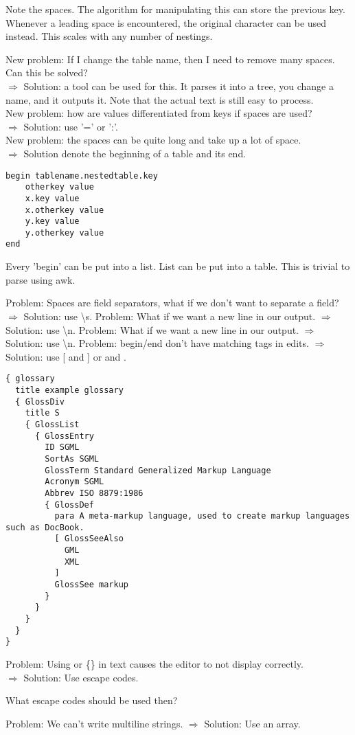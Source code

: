 \documentclass[listof=totoc]{article}
\begin{document}
Note the spaces. The algorithm for manipulating this can store the previous key. Whenever a leading space is
encountered, the original character can be used instead. This scales with any number of nestings.

New problem: If I change the table name, then I need to remove many spaces. Can this be solved?\\
$\Rightarrow$ Solution: a tool can be used for this. It parses it into a tree, you change a name, and it outputs it. Note that the actual text is still easy to process.\\
New problem: how are values differentiated from keys if spaces are used?\\
$\Rightarrow$ Solution: use '=' or ':'.\\
New problem: the spaces can be quite long and take up a lot of space.\\
$\Rightarrow$ Solution denote the beginning of a table and its end.\\

\begin{verbatim}
begin tablename.nestedtable.key
	otherkey value
	x.key value
	x.otherkey value
	y.key value
	y.otherkey value
end
\end{verbatim}

Every 'begin' can be put into a list. List can be put into a table.
This is trivial to parse using awk.

Problem: Spaces are field separators, what if we don't want to separate a field?\\
$\Rightarrow$ Solution: use \textbackslash s.
Problem: What if we want a new line in our output.
$\Rightarrow$ Solution: use \textbackslash n.
Problem: What if we want a new line in our output.
$\Rightarrow$ Solution: use \textbackslash n.
Problem: begin/end don't have matching tags in edits.
$\Rightarrow$ Solution: use [ and ] or { and }.

\begin{verbatim}
{ glossary
  title example glossary
  { GlossDiv
    title S
    { GlossList
      { GlossEntry
        ID SGML
        SortAs SGML
        GlossTerm Standard Generalized Markup Language
        Acronym SGML
        Abbrev ISO 8879:1986
        { GlossDef
          para A meta-markup language, used to create markup languages such as DocBook.
          [ GlossSeeAlso
            GML
            XML
          ]
          GlossSee markup
        }
      }
    }
  }
}
\end{verbatim}

Problem: Using \lbrack \rbrack or \{\} in text causes the editor to not display correctly.\\
$\Rightarrow$ Solution: Use escape codes.

What escape codes should be used then?

Problem: We can't write multiline strings.
$\Rightarrow$ Solution: Use an array.
\end{document}
